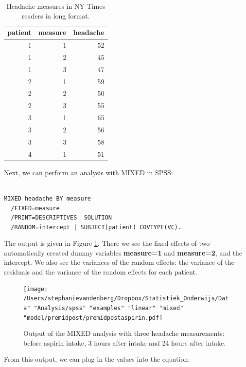 \documentclass[]{book}\usepackage[]{graphicx}\usepackage[]{color}
\begin{document}
\begin{table}[ht]
\centering
\caption{Headache measures in NY Times readers in long format.} 
\label{tab:analysispremidpost2}
\begin{tabular}{rrr}
  \hline
patient & measure & headache \\ 
  \hline
1 & 1 & 52 \\ 
  1 & 2 & 45 \\ 
  1 & 3 & 47 \\ 
  2 & 1 & 59 \\ 
  2 & 2 & 50 \\ 
  2 & 3 & 55 \\ 
  3 & 1 & 65 \\ 
  3 & 2 & 56 \\ 
  3 & 3 & 58 \\ 
  4 & 1 & 51 \\ 
   \hline
\end{tabular}
\end{table}


Next, we can perform an analysis with MIXED in SPSS:

\begin{verbatim}

MIXED headache BY measure
  /FIXED=measure
  /PRINT=DESCRIPTIVES  SOLUTION
  /RANDOM=intercept | SUBJECT(patient) COVTYPE(VC).
\end{verbatim}

The output is given in Figure \ref{fig:premidpostaspirin}. There we see the fixed effects of two automatically created dummy variables \textbf{measure=1} and \textbf{measure=2}, and the intercept. We also see the variances of the random effects: the variance of the residuals and the variance of the random effects for each patient.


\begin{figure}[h]
    \begin{center}
       \texttt{[image: /Users/stephanievandenberg/Dropbox/Statistiek\_Onderwijs/Data" "Analysis/spss" "examples" "linear" "mixed" "model/premidpost/premidpostaspirin.pdf]}
    \end{center}
    \label{fig:premidpostaspirin}
    \caption{Output of the MIXED analysis with three headache measurements: before aspirin intake, 3 hours after intake and 24 hours after intake.}
\end{figure}



From this output, we can plug in the values into the equation:
\end{document}
